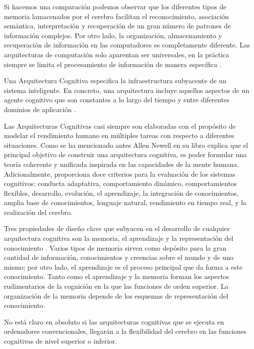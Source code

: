 Si hacemos una comparaci\'{o}n podemos observar que los diferentes tipos de memoria lamacenados por el cerebro facilitan el reconocimiento, asociaci\'{o}n sem\'{a}ntica, interpretaci\'{o}n y recuperaci\'{o}n de un gran n\'{u}mero de patrones de informaci\'{o}n complejos. Por otro lado, la organizaci\'{o}n, almacenamiento y recuperaci\'{o}n de informaci\'{o}n en las computadores es completamente diferente. Las arquitecturas de computaci\'{o}n solo aparentan ser universales, en la pr\'{a}ctica siempre se limita el procesamiento de informaci\'{o}n de manera espec\'{i}fica \cite{duch2008cognitive}. 

Una Arquitectura Cognitiva especifica la infraestructura subyacente de un sistema inteligente. En concreto, una arquitectura incluye aquellos aspectos de un agente cognitivo que son constantes a lo largo del tiempo y entre
diferentes dominios de aplicación \cite{langley2009cognitive}.

Las Arquitecturas Cognitivas casi siempre son elaboradas con el prop\'{o}sito de  modelar el rendimiento humano en múltiples tareas con respecto a diferentes situaciones. Como se ha mencionado antes Allen Newell en su libro \cite{newell1994unified} explica que el principal objetivo de construir una arquitectura cognitiva, es poder formular una teor\'{i}a coherente y unificada inspirada en las capacidades de la mente humana. Adicionalmente, proporciona doce criterios para la evaluación de los sistemas cognitivos: conducta adaptativa, comportamiento dinámico, comportamientos flexibles, desarrollo, evolución, el aprendizaje, la integración de conocimientos, amplia base de conocimientos, lenguaje natural, rendimiento en tiempo real, y la realización del cerebro.

Tres propiedades de diseño clave que subyacen en el desarrollo de cualquier arquitectura cognitiva son la memoria,
el aprendizaje y la representaci\'{o}n del conocimiento \cite{langley2009cognitive,duch2008cognitive}. Varios tipos de memoria sirven como depósito para la gran cantidad de informaci\'{o}n, conocimientos y creencias sobre el mundo y de uno mismo; por otro lado, el aprendizaje es el proceso principal que da forma a este conocimiento. Tanto como el aprendizaje y la memoria forman los aspectos rudimentarios de la cognición en la que las funciones de orden superior. La organizaci\'{o}n de la memoria depende de los esquemas de representación del conocimiento. 
 
 No está claro en absoluto si las arquitecturas cognitivas que se ejecuta en ordenadores convencionales, llegar\'{a}n a la flexibilidad del cerebro en las funciones cognitivas de nivel superior o inferior.

